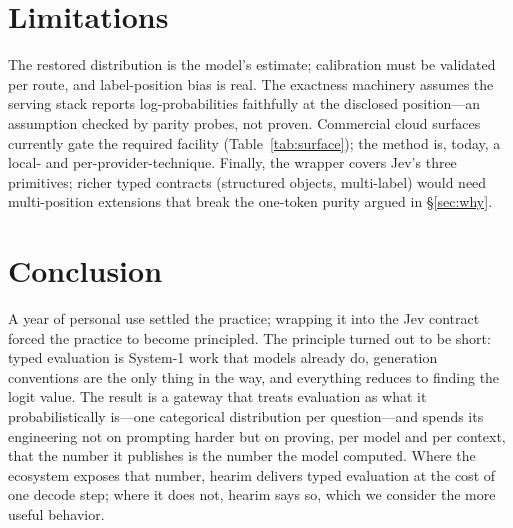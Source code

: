 \documentclass[11pt]{article}
\begin{document}
\section{Limitations}

The restored distribution is the model's estimate; calibration must be
validated per route, and label-position bias is real. The exactness
machinery assumes the serving stack reports log-probabilities faithfully
at the disclosed position---an assumption checked by parity probes, not
proven. Commercial cloud surfaces currently gate the required facility
(Table~\ref{tab:surface}); the method is, today, a local- and
per-provider-technique. Finally, the wrapper covers Jev's three
primitives; richer typed contracts (structured objects, multi-label) would
need multi-position extensions that break the one-token purity argued in
\S\ref{sec:why}.

\section{Conclusion}

A year of personal use settled the practice; wrapping it into the Jev
contract forced the practice to become principled. The principle turned
out to be short: typed evaluation is System-1 work that models already do,
generation conventions are the only thing in the way, and everything
reduces to finding the logit value. The result is a
gateway that treats evaluation as what it probabilistically is---one
categorical distribution per question---and spends its engineering not on
prompting harder but on proving, per model and per context, that the
number it publishes is the number the model computed. Where the ecosystem
exposes that number, hearim delivers typed evaluation at the cost of one
decode step; where it does not, hearim says so, which we consider the
more useful behavior.
\end{document}
